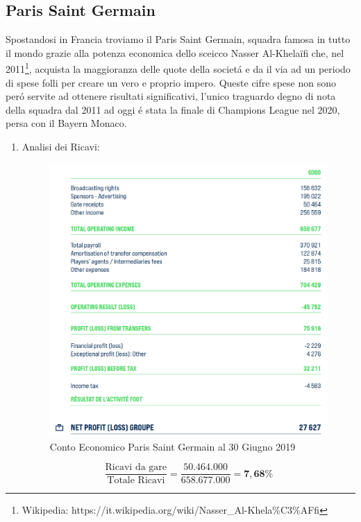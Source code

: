 \documentclass[
    corpo=12pt,
    oneside,
    evenboxes,
    tipotesi=triennale,
    stile=classica,
    oldstyle,
    autoretitolo,
    greek,
]{toptesi}
\begin{document}
\begin{interlinea}{1.5}
\subsection{Paris Saint Germain}
Spostandosi in Francia troviamo il Paris Saint Germain, squadra famosa in tutto il mondo grazie alla potenza economica dello sceicco Nasser Al-Khelaïfi 
che, nel 2011\footnote{Wikipedia: https://it.wikipedia.org/wiki/Nasser\_Al-Khela\%C3\%AFfi}, acquista la maggioranza delle quote della societ\'a e da il via 
ad un periodo di spese folli per creare un vero e proprio impero.
Queste cifre spese non sono per\'o servite ad ottenere risultati significativi, l'unico traguardo degno di nota della squadra dal 2011 ad oggi
\'e stata la finale di Champions League nel 2020, persa con il Bayern Monaco.\newpage
\begin{enumerate}
    \item Analisi dei Ricavi:\newline
        \begin{figure}
            \centering
            \includegraphics[scale=.4]{img/CE_psg.png}
            \caption{Conto Economico Paris Saint Germain al 30 Giugno 2019}
            \label{ce_psg}
        \end{figure}\newline
        \begin{equation}
            \frac{\text{Ricavi da gare}}{\text{Totale Ricavi}} = \frac{50.464.000}{658.677.000} = \mathbf{7,68\%}

\end{equation}
\end{enumerate}
\end{interlinea}
\end{document}
